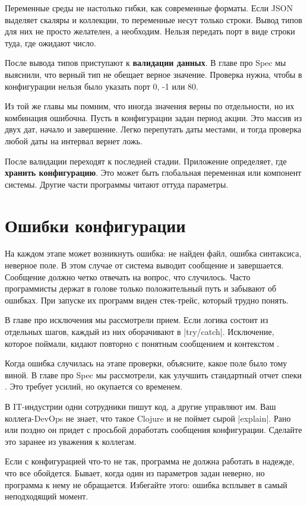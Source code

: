 Переменные среды не настолько гибки, как современные форматы. Если JSON выделяет
скаляры и коллекции, то переменные несут только строки. Вывод типов для них не
просто желателен, а необходим. Нельзя передать порт в виде строки туда, где
ожидают число.

После вывода типов приступают к \textbf{валидации данных}. В главе про Spec мы
выяснили, что верный тип не обещает верное значение. Проверка нужна, чтобы в
конфигурации нельзя было указать порт 0, -1 или 80.

Из той же главы мы помним, что иногда значения верны по отдельности, но их
комбинация ошибочна. Пусть в конфигурации задан период акции. Это массив из двух
дат, начало и завершение. Легко перепутать даты местами, и тогда проверка любой
даты на интервал вернет ложь.

После валидации переходят к последней стадии. Приложение определяет, где
\textbf{хранить конфигурацию}. Это может быть глобальная переменная или
компонент системы. Другие части программы читают оттуда параметры.

\section{Ошибки конфигурации}

На каждом этапе может возникнуть ошибка: не найден файл, ошибка синтаксиса,
неверное поле. В этом случае от система выводит сообщение и
завершается. Сообщение должно четко отвечать на вопрос, что случилось. Часто
программисты держат в голове только положительный путь и забывают об
ошибках. При запуске их программ виден стек-трейс, который трудно понять.

В главе про исключения мы рассмотрели прием. Если логика состоит из отдельных
шагов, каждый из них оборачивают в \spverb|try/catch|. Исключение, которое
поймали, кидают повторно с понятным сообщением и
контекстом .

Когда ошибка случилась на этапе проверки, объясните, какое поле было тому
виной. В главе про Spec мы рассмотрели, как улучшить стандартный отчет
спеки . Это требует усилий, но окупается со временем.

В IT-индустрии одни сотрудники пишут код, а другие управляют им. Ваш
коллега-DevOps не знает, что такое Clojure и не поймет сырой
\spverb|explain|. Рано или поздно он придет с просьбой доработать сообщения
конфигурации. Сделайте это заранее из уважения к коллегам.

Если с конфигурацией что-то не так, программа не должна работать в надежде, что
все обойдется. Бывает, когда один из параметров задан неверно, но программа к
нему не обращается. Избегайте этого: ошибка всплывет в самый неподходящий
момент.

